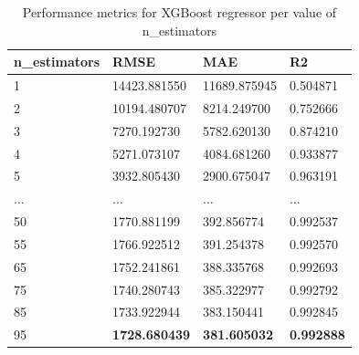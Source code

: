 \begin{table}[!htbp]
    \centering
    \begin{tabularx}{\textwidth}{XXXX}
    \hline
    \textbf{n\_estimators} & \textbf{RMSE} & \textbf{MAE} & \textbf{R2} \\
    \hline
    1 & 14423.881550 & 11689.875945 & 0.504871 \\
    2 & 10194.480707 & 8214.249700 & 0.752666 \\
    3 & 7270.192730 & 5782.620130 & 0.874210 \\
    4 & 5271.073107 & 4084.681260 & 0.933877 \\
    5 & 3932.805430 & 2900.675047 & 0.963191 \\
    ...&...&...&...\\
    50 & 1770.881199 & 392.856774 & 0.992537 \\
    55 & 1766.922512 & 391.254378 & 0.992570 \\
    65 & 1752.241861 & 388.335768 & 0.992693 \\
    75 & 1740.280743 & 385.322977 & 0.992792 \\
    85 & 1733.922944 & 383.150441 & 0.992845 \\
    95 & \textbf{1728.680439} & \textbf{381.605032} & \textbf{0.992888} \\
    \hline
    \end{tabularx}
    \caption{Performance metrics for XGBoost regressor per value of n\_estimators}
    \label{tab:XGBoost score per N_estimators}
\end{table}

